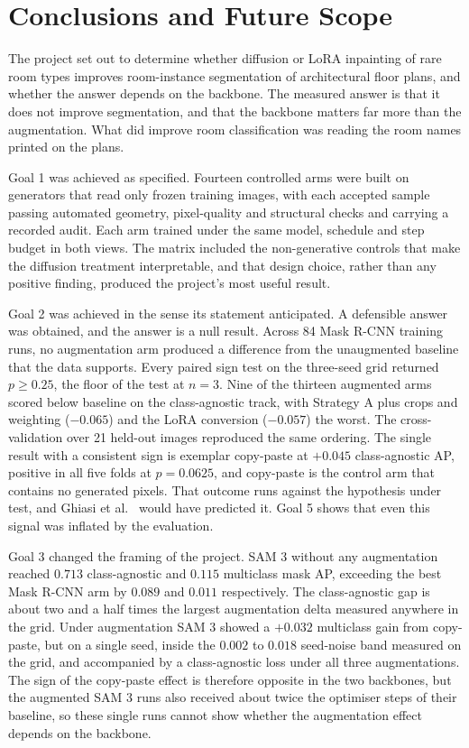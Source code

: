 \section{Conclusions and Future Scope}

The project set out to determine whether diffusion or LoRA inpainting of rare
room types improves room-instance segmentation of architectural floor plans, and
whether the answer depends on the backbone. The measured answer is that it does
not improve segmentation, and that the backbone matters far more than the
augmentation. What did improve room classification was reading the room names
printed on the plans.

Goal 1 was achieved as specified. Fourteen controlled arms were built on
generators that read only frozen training images, with each accepted sample
passing automated geometry, pixel-quality and structural checks and carrying a
recorded audit. Each arm trained under the same model, schedule and step budget
in both views. The matrix included the non-generative controls that make the
diffusion treatment interpretable, and that design choice, rather than any
positive finding, produced the project's most useful result.

Goal 2 was achieved in the sense its statement anticipated. A defensible answer
was obtained, and the answer is a null result. Across 84 Mask R-CNN training
runs, no augmentation arm produced a difference from the unaugmented baseline
that the data supports. Every paired sign test on the three-seed grid returned
$p \ge 0.25$, the floor of the test at $n=3$. Nine of the thirteen augmented arms scored below baseline on the class-agnostic track, with Strategy A plus crops and weighting ($-0.065$) and the LoRA conversion ($-0.057$) the worst. The cross-validation over 21 held-out images reproduced the
same ordering. The single result with a consistent sign is exemplar copy-paste
at $+0.045$ class-agnostic AP, positive in all five folds at $p = 0.0625$, and
copy-paste is the control arm that contains no generated pixels. That outcome runs against the hypothesis under test, and Ghiasi et al.\ \cite{ghiasi2021copypaste} would have predicted it. Goal 5 shows that even this signal was inflated by the evaluation.

Goal 3 changed the framing of the project. SAM 3 without any augmentation
reached $0.713$ class-agnostic and $0.115$ multiclass mask AP, exceeding the
best Mask R-CNN arm by $0.089$ and $0.011$ respectively. The class-agnostic gap
is about two and a half times the largest augmentation delta measured anywhere
in the grid. Under augmentation SAM 3 showed a $+0.032$ multiclass gain from
copy-paste, but on a single seed, inside the $0.002$ to $0.018$ seed-noise band
measured on the grid, and accompanied by a class-agnostic loss under all three
augmentations. The sign of the copy-paste effect is therefore opposite in the two backbones, but the augmented SAM 3 runs also received about twice the optimiser steps of their baseline, so these single runs cannot show whether the augmentation effect depends on the backbone.

